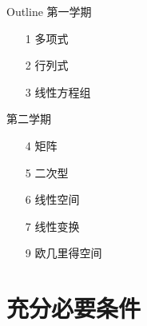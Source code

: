 \documentclass[13pt]{beamer}
\begin{document}
%
%
%
%
%


\begin{frame}{Outline}
\alert{第一学期}
\begin{itemize}
\item[1]多项式
\item[2] 行列式
\item[3] 线性方程组
\end{itemize}

\alert{第二学期}
\begin{itemize}
\item[4] 矩阵
\item[5] 二次型
\item[6] 线性空间
\item[7] 线性变换
\item[9] 欧几里得空间
\end{itemize}

\end{frame}


\section{充分必要条件}
\end{document}

